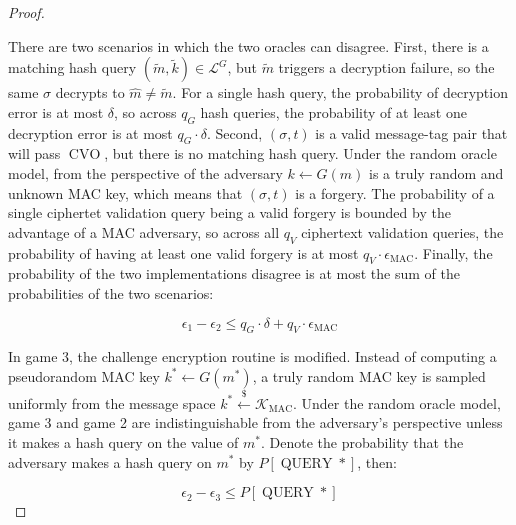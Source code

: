 \documentclass{article}
\newcommand{\leftsample}{\overset{{\scriptscriptstyle\$}}{\leftarrow}}
\newcommand{\pk}{\operatorname{pk}}
\newcommand{\cvo}{\operatorname{CVO}}
\begin{document}
\begin{proof}
\begin{multicols}{2}
        \begin{algorithm}[H]
            \caption{$\cvo_1$}
            \SetAlgoLined
            \If{
                $\exists (\tilde{m}, \tilde{k}) \in \mathcal{L}^G$ s.t.
                $E(\pk, \tilde{m}) = c$ and $V(\tilde{k}, \sigma, t) = 1$
            }{
                \Return{$1$}\;
            }
            \;
        \end{algorithm}
    \end{multicols}

    There are two scenarios in which the two oracles can disagree. First, there is a matching hash query $(\tilde{m}, \tilde{k}) \in \mathcal{L}^G$, but $\tilde{m}$ triggers a decryption failure, so the same $\sigma$ decrypts to $\hat{m} \neq \tilde{m}$. For a single hash query, the probability of decryption error is at most $\delta$, so across $q_G$ hash queries, the probability of at least one decryption error is at most $q_G \cdot \delta$. Second, $(\sigma, t)$ is a valid message-tag pair that will pass $\cvo$, but there is no matching hash query. Under the random oracle model, from the perspective of the adversary $k \leftarrow G(m)$ is a truly random and unknown MAC key, which means that $(\sigma, t)$ is a forgery. The probability of a single ciphertet validation query being a valid forgery is bounded by the advantage of a MAC adversary, so across all $q_V$ ciphertext validation queries, the probability of having at least one valid forgery is at most $q_V\cdot\epsilon_\text{MAC}$. Finally, the probability of the two implementations disagree is at most the sum of the probabilities of the two scenarios:

    \begin{equation*}
        \epsilon_1 - \epsilon_2 \leq q_G \cdot \delta + q_V \cdot \epsilon_\text{MAC}
    \end{equation*}

    In game 3, the challenge encryption routine is modified. Instead of computing a pseudorandom MAC key $k^\ast \leftarrow G(m^\ast)$, a truly random MAC key is sampled uniformly from the message space $k^\ast \leftsample \mathcal{K}_\text{MAC}$. Under the random oracle model, game 3 and game 2 are indistinguishable from the adversary's perspective unless it makes a hash query on the value of $m^\ast$. Denote the probability that the adversary makes a hash query on $m^\ast$ by $P[\operatorname{QUERY}\ast]$, then:

    \begin{equation*}
        \epsilon_2 - \epsilon_3 \leq P[\operatorname{QUERY}\ast]
    \end{equation*}



\end{proof}
\end{document}
